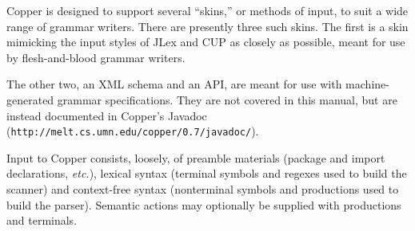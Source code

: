 \documentclass[12pt,english,twoside]{report}
\begin{document}
Copper is designed to support several {}``skins,'' or methods of
input, to suit a wide range of grammar writers. There are presently
three such skins. The first is a skin mimicking the input styles of
JLex and CUP as closely as possible, meant for use by flesh-and-blood
grammar writers.

The other two, an XML schema and an API, are meant for use with
machine-generated grammar specifications. They are not covered in this
manual, but are instead documented in Copper's Javadoc
(\texttt{http://melt.cs.umn.edu/copper/0.7/javadoc/}).

Input to Copper consists, loosely, of preamble materials (package and
import declarations, \emph{etc.}), lexical syntax (terminal symbols
and regexes used to build the scanner) and context-free syntax
(nonterminal symbols and productions used to build the parser).
Semantic actions may optionally be supplied with productions and
terminals.
\end{document}
